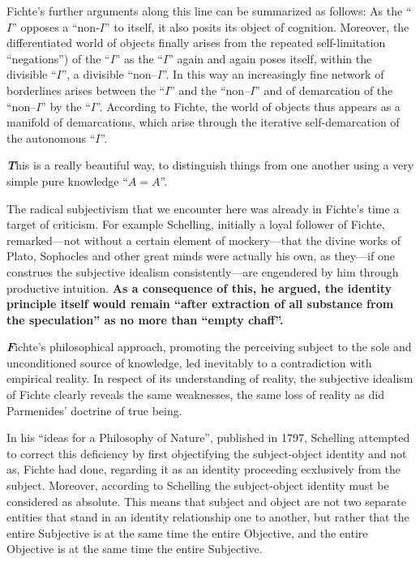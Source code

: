 \documentclass[10pt]{article}
\newenvironment{callout}
	{\begin{calloutbox}\color{charcoal}\textbf\textit}
	{\end{calloutbox}}
\begin{document}
            Fichte's further arguments along this line can be summarized as follows: As the “$I$” opposes a “non-$I$” to itself, it also posits its object of cognition. Moreover, the differentiated world of objects finally arises from the repeated self-limitation “negations”) of the “$I$” as the “$I$” again and again poses itself, within the divisible “$I$”, a divisible “non–$I$”. In this way an increasingly fine network of borderlines arises between the “$I$” and the “non–$I$” and of demarcation of the “non–$I$” by the “$I$”. According to Fichte, the world of objects thus appears as a manifold of demarcations, which arise through the iterative self-demarcation of the autonomous “$I$”.
            \begin{callout}
                This is a really beautiful way, to distinguish things from one another using a very simple pure knowledge “$A=A$”. 
            \end{callout}
            The radical subjectivism that we encounter here was already in Fichte's time a target of criticism. For example Schelling, initially a loyal follower of Fichte, remarked—not without a certain element of mockery—that the divine works of Plato, Sophocles and other great minds were actually his own, as they—if one construes the subjective idealism  consistently—are engendered by him through productive intuition. \textbf{As a consequence of this, he argued, the identity principle itself would remain “after extraction of all substance from the speculation” as no more than “empty chaff”.}
            \begin{callout}
                Fichte's philosophical approach, promoting the perceiving subject to the sole and unconditioned source of knowledge, led inevitably to a contradiction with empirical reality. In respect of its understanding of reality, the subjective idealism of Fichte clearly reveals the same weaknesses, the same loss of reality as did Parmenides' doctrine of true being.
            \end{callout}
            In his “ideas for a Philosophy of Nature”, published in 1797, Schelling attempted to correct this deficiency by first objectifying the subject-object identity and not as, Fichte had done, regarding it as an identity proceeding ecxlusively from the subject. Moreover, according to Schelling the subject-object identity must be considered as absolute. This means that subject and object are not two separate entities that stand in an identity relationship one to another, but rather that the entire Subjective is at the same time the entire Objective, and the entire Objective is at the same time the entire Subjective.
\end{document}
